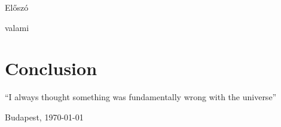 \documentclass[../main.tex]{subfiles}
\begin{document}
{\Large{Előszó}}

valami

\section*{Conclusion}
``I always thought something was fundamentally wrong with the universe'' \citep{adams1995hitchhiker}


Budapest, \today

\myname
\end{document}
